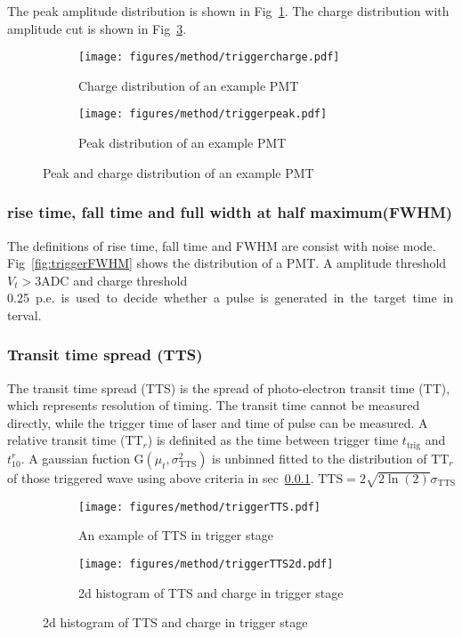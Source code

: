 The peak amplitude distribution is shown in Fig~\ref{fig:triggerpeak}. The charge distribution with amplitude cut is shown in Fig~\ref{fig:triggercharge}.
\begin{figure}[!htbp]
    \centering
    \begin{subfigure}[b]{0.45\textwidth}
        \texttt{[image: figures/method/triggercharge.pdf]}
        \caption{Charge distribution of an example PMT}%
        \label{fig:triggerpeak}
    \end{subfigure}
    \begin{subfigure}[b]{0.45\textwidth}
        \texttt{[image: figures/method/triggerpeak.pdf]}
        \caption{Peak distribution of an example PMT}%
        \label{fig:triggercharge}
    \end{subfigure}
    \caption{Peak and charge distribution of an example PMT}
\end{figure}

\subsubsection{rise time, fall time and full width at half maximum(FWHM)}
\label{sec:triggerFWHM}
The definitions of rise time, fall time and FWHM are consist with noise mode. Fig~\ref{fig:triggerFWHM} shows the distribution of a PMT. A amplitude threshold $V_{t}>3\mathrm{ADC}$ and charge threshold \SI{0.25}{p.e.} is used to decide whether a pulse is generated in the target time interval.
\begin{figure}[!htbp]
    \centering
    
\end{figure}
\subsubsection{Transit time spread (TTS)}
The transit time spread (TTS) is the spread of photo-electron transit time (TT), which represents resolution of timing. The transit time cannot be measured directly, while the trigger time of laser and time of pulse can be measured. A relative transit time ($\mathrm{TT}_r$) is definited as the time between trigger time $t_{\mathrm{trig}}$ and $t_{10}^r$. A gaussian fuction G$(\mu_t,\sigma_{\mathrm{TTS}}^2)$ is unbinned fitted to the distribution of $\mathrm{TT}_r$ of those triggered wave using above criteria in sec~\ref{sec:triggerFWHM}. $\mathrm{TTS}=2\sqrt{2\ln(2)}\sigma_{\mathrm{TTS}}$
\begin{figure}[!htbp]
    \centering
    \begin{subfigure}[t]{0.47\textwidth}
        \texttt{[image: figures/method/triggerTTS.pdf]}
        \caption{An example of TTS in trigger stage}
        \label{fig:triggerTTS}
    \end{subfigure}
    \begin{subfigure}[t]{0.47\textwidth}
        \texttt{[image: figures/method/triggerTTS2d.pdf]}
        \caption{2d histogram of TTS and charge in trigger stage}
        \label{fig:triggerTTS2d}
    \end{subfigure}
\end{figure}
